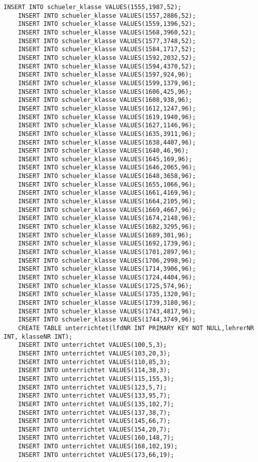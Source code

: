 \begin{lstlisting}[breaklines=True, numbers=none, basicstyle=\tiny, keepspaces=false]
	INSERT INTO schueler_klasse VALUES(1555,1987,52);
	INSERT INTO schueler_klasse VALUES(1557,2886,52);
	INSERT INTO schueler_klasse VALUES(1559,1396,52);
	INSERT INTO schueler_klasse VALUES(1568,3960,52);
	INSERT INTO schueler_klasse VALUES(1577,3748,52);
	INSERT INTO schueler_klasse VALUES(1584,1717,52);
	INSERT INTO schueler_klasse VALUES(1592,2032,52);
	INSERT INTO schueler_klasse VALUES(1594,4370,52);
	INSERT INTO schueler_klasse VALUES(1597,924,96);
	INSERT INTO schueler_klasse VALUES(1599,1379,96);
	INSERT INTO schueler_klasse VALUES(1606,425,96);
	INSERT INTO schueler_klasse VALUES(1608,938,96);
	INSERT INTO schueler_klasse VALUES(1612,1247,96);
	INSERT INTO schueler_klasse VALUES(1619,1940,96);
	INSERT INTO schueler_klasse VALUES(1627,1146,96);
	INSERT INTO schueler_klasse VALUES(1635,3911,96);
	INSERT INTO schueler_klasse VALUES(1638,4407,96);
	INSERT INTO schueler_klasse VALUES(1640,46,96);
	INSERT INTO schueler_klasse VALUES(1645,169,96);
	INSERT INTO schueler_klasse VALUES(1646,2065,96);
	INSERT INTO schueler_klasse VALUES(1648,3658,96);
	INSERT INTO schueler_klasse VALUES(1655,1066,96);
	INSERT INTO schueler_klasse VALUES(1661,4169,96);
	INSERT INTO schueler_klasse VALUES(1664,2105,96);
	INSERT INTO schueler_klasse VALUES(1669,4667,96);
	INSERT INTO schueler_klasse VALUES(1674,2148,96);
	INSERT INTO schueler_klasse VALUES(1682,3295,96);
	INSERT INTO schueler_klasse VALUES(1689,301,96);
	INSERT INTO schueler_klasse VALUES(1692,1739,96);
	INSERT INTO schueler_klasse VALUES(1701,2897,96);
	INSERT INTO schueler_klasse VALUES(1706,2998,96);
	INSERT INTO schueler_klasse VALUES(1714,3906,96);
	INSERT INTO schueler_klasse VALUES(1724,4404,96);
	INSERT INTO schueler_klasse VALUES(1725,574,96);
	INSERT INTO schueler_klasse VALUES(1735,1320,96);
	INSERT INTO schueler_klasse VALUES(1739,3180,96);
	INSERT INTO schueler_klasse VALUES(1743,4817,96);
	INSERT INTO schueler_klasse VALUES(1744,3749,96);
	CREATE TABLE unterrichtet(lfdNR INT PRIMARY KEY NOT NULL,lehrerNR INT, klasseNR INT);
	INSERT INTO unterrichtet VALUES(100,5,3);
	INSERT INTO unterrichtet VALUES(103,20,3);
	INSERT INTO unterrichtet VALUES(110,85,3);
	INSERT INTO unterrichtet VALUES(114,38,3);
	INSERT INTO unterrichtet VALUES(115,155,3);
	INSERT INTO unterrichtet VALUES(123,5,7);
	INSERT INTO unterrichtet VALUES(133,95,7);
	INSERT INTO unterrichtet VALUES(135,102,7);
	INSERT INTO unterrichtet VALUES(137,38,7);
	INSERT INTO unterrichtet VALUES(145,66,7);
	INSERT INTO unterrichtet VALUES(154,20,7);
	INSERT INTO unterrichtet VALUES(160,148,7);
	INSERT INTO unterrichtet VALUES(168,102,19);
	INSERT INTO unterrichtet VALUES(173,66,19);

\end{lstlisting}
